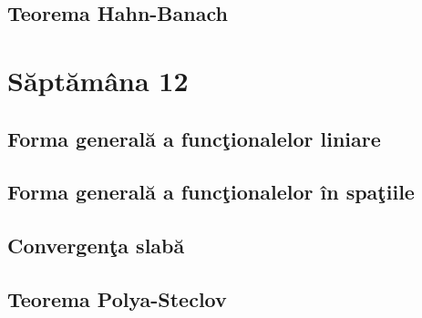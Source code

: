 \documentclass[a4paper,12pt]{article}
\theoremstyle{change}
\begin{document}
\subsection{Teorema Hahn-Banach}

\section{Săptămâna 12}


\subsection{Forma generală a funcţionalelor liniare}


\subsection{Forma generală a funcţionalelor în spaţiile }


\subsection{Convergenţa slabă}

\subsection{Teorema Polya-Steclov}
\end{document}
